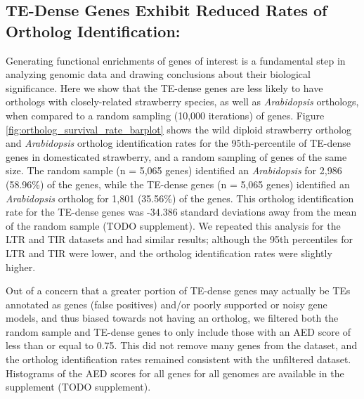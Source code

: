 \documentclass[fleqn,10pt]{olplainarticle}
\begin{document}

\subsection{TE-Dense Genes Exhibit Reduced Rates of Ortholog Identification:}
Generating functional enrichments of genes of interest is a fundamental step in analyzing genomic data and drawing conclusions about their biological significance.
Here we show that the TE-dense genes are less likely to have orthologs with closely-related strawberry species, as well as \textit{Arabidopsis} orthologs, when compared to a random sampling (10,000 iterations) of genes.
Figure \ref{fig:ortholog_survival_rate_barplot} shows the wild diploid strawberry ortholog and \textit{Arabidopsis} ortholog identification rates for the 95th-percentile of TE-dense genes in domesticated strawberry, and a random sampling of genes of the same size.
The random sample (n = 5,065 genes) identified an \textit{Arabidopsis} for 2,986 (58.96\%) of the genes, while the TE-dense genes (n = 5,065 genes) identified an \textit{Arabidopsis} ortholog for 1,801 (35.56\%) of the genes.
This ortholog identification rate for the TE-dense genes was -34.386 standard deviations away from the mean of the random sample (TODO supplement).
We repeated this analysis for the LTR and TIR datasets and had similar results; although the 95th percentiles for LTR and TIR were lower, and the ortholog identification rates were slightly higher.


Out of a concern that a greater portion of TE-dense genes may actually be TEs annotated as genes (false positives) and/or poorly supported or noisy gene models, and thus biased towards not having an ortholog, we filtered both the random sample and TE-dense genes to only include those with an AED score of less than or equal to 0.75.
This did not remove many genes from the dataset, and the ortholog identification rates remained consistent with the unfiltered dataset.
Histograms of the AED scores for all genes for all genomes are available in the supplement (TODO supplement).
\end{document}
